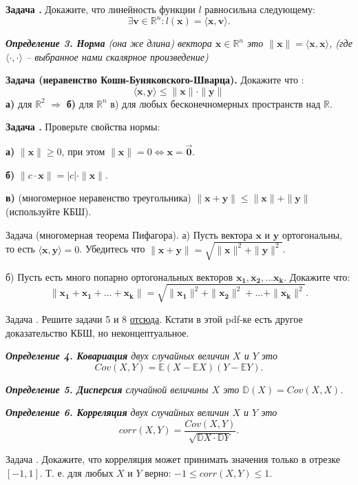 \documentclass[12pt,a4paper]{article}
\def\R{\mathbb{R}}
\def\E{\mathbb{E}}
\def\D{\mathbb{D}}
\newcounter{znum}
\newcommand{\zz}[1]{\addtocounter{znum}{1} \textbf{Задача \arabic{znum}#1. }}
\newcommand{\z}[1]{\addtocounter{znum}{1} Задача \arabic{znum}#1. }
\begin{document}
\zz{} Докажите, что линейность функции $l$ равносильна следующему:
$$ \exists \mathbf{v} \in \R^n : l(\mathbf{x}) = \langle \mathbf{x}, \mathbf{v}\rangle.$$


{\it \textbf{Определение 3. Норма} (она же длина) вектора $\mathbf{x} \in \R^n$ это $ \|\mathbf{x}\| = \langle \mathbf{x}, \mathbf{x} \rangle$, (где $\langle \cdot , \cdot \rangle$ -- выбранное нами скалярное произведение)}

\zz{ (неравенство Коши-Буняковского-Шварца)} Докажите что :
$$ \langle \mathbf{x}, \mathbf{y} \rangle  \leqslant \|\mathbf{x}\| \cdot \|\mathbf{y}\|$$
\textbf{а)} для $\R^2$ $\Rightarrow$
\textbf{б)} для $\R^n$
в) для любых бесконечномерных пространств над $\R$.

\zz{} Проверьте свойства нормы:\par
\textbf{а)} $\|\mathbf{x}\| \geqslant 0$, при этом $\|\mathbf{x}\| = 0 \Leftrightarrow \mathbf{x} = \overrightarrow{\mathbf{0}}$. \par
\textbf{б)} $\|c \cdot \mathbf{x}\| = |c| \cdot \|\mathbf{x}\|$. \par
\textbf{в)} (многомерное неравенство треугольника) $\|\mathbf{x} + \mathbf{y}\| \leqslant \|\mathbf{x}\| + \|\mathbf{y}\|$ (используйте КБШ).

\z{ (многомерная теорема Пифагора)} а) Пусть вектора $\mathbf{x}$ и $\mathbf{y}$ ортогональны, то есть $\langle \mathbf{x}, \mathbf{y} \rangle = 0$. Убедитесь что $\|\mathbf{x} + \mathbf{y}\| = \sqrt{\|\mathbf{x}\|^2 + \|\mathbf{y}\|^2}$.

б) Пусть есть много попарно ортогональных векторов $\mathbf{x_1}, \mathbf{x_2}, \ldots \mathbf{x_k}$. Докажите что: $$\|\mathbf{x_1} + \mathbf{x_1} + \ldots + \mathbf{x_k}\| = \sqrt{\|\mathbf{x_1}\|^2 + \|\mathbf{x_2}\|^2 + \ldots + \|\mathbf{x_k}\|^2}. $$

\z{} Решите задачи 5 и 8 \href{https://zftsh.online/public/folder\_attachment/a0/a9/a8f7\_061b.pdf?c=006f}{отсюда}. Кстати в этой pdf-ке есть другое доказательство КБШ, но неконцептуальное.

{\it \textbf{Определение 4. Ковариация} двух случайных величин $X$ и $Y$ это
$$Cov(X, Y) = \E (X - \E X)(Y - \E Y).$$
}

{\it \textbf{Определение 5. Дисперсия} случайной величины $X$ это $\D (X) = Cov(X, X)$.}

{\it \textbf{Определение 6. Корреляция} двух случайных величин $X$ и $Y$ это
$$corr(X, Y) = \frac{Cov(X, Y)}{\sqrt{\D X \cdot \D Y}}.$$}

\z{} Докажите, что корреляция может принимать значения только в отрезке $[-1, 1]$. Т. е. для любых $X$ и $Y$ верно: $-1 \leqslant corr(X, Y) \leqslant 1$.
\end{document}
